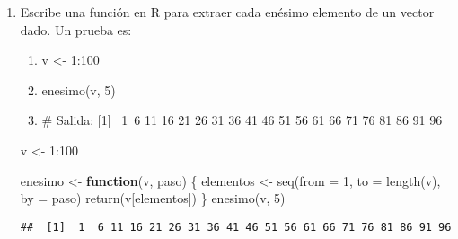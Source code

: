 \documentclass[
]{article}
\newenvironment{Shaded}{\begin{snugshade}}{\end{snugshade}}
\newcommand{\AttributeTok}[1]{\textcolor[rgb]{0.77,0.63,0.00}{#1}}
\newcommand{\ControlFlowTok}[1]{\textcolor[rgb]{0.13,0.29,0.53}{\textbf{#1}}}
\newcommand{\DecValTok}[1]{\textcolor[rgb]{0.00,0.00,0.81}{#1}}
\newcommand{\FunctionTok}[1]{\textcolor[rgb]{0.00,0.00,0.00}{#1}}
\newcommand{\NormalTok}[1]{#1}
\newcommand{\OtherTok}[1]{\textcolor[rgb]{0.56,0.35,0.01}{#1}}
\newcommand{\SpecialCharTok}[1]{\textcolor[rgb]{0.00,0.00,0.00}{#1}}
\begin{document}
\begin{enumerate}
\def\labelenumi{\arabic{enumi}.}
\setcounter{enumi}{8}
\item
  Escribe una función en R para extraer cada enésimo elemento de un
  vector dado. Un prueba es:

  \begin{enumerate}
  \def\labelenumii{\alph{enumii}.}
  \item
    v \textless- 1:100
  \item
    enesimo(v, 5)
  \item
    \# Salida: {[}1{]}~ 1~6 11 16 21 26 31 36 41 46 51 56 61 66 71 76 81
    86 91 96
  \end{enumerate}

\begin{Shaded}
\begin{Highlighting}[]
\NormalTok{v }\OtherTok{\textless{}{-}} \DecValTok{1}\SpecialCharTok{:}\DecValTok{100}

\NormalTok{enesimo }\OtherTok{\textless{}{-}} \ControlFlowTok{function}\NormalTok{(v, paso) \{}
\NormalTok{  elementos }\OtherTok{\textless{}{-}} \FunctionTok{seq}\NormalTok{(}\AttributeTok{from =} \DecValTok{1}\NormalTok{, }\AttributeTok{to =} \FunctionTok{length}\NormalTok{(v), }\AttributeTok{by =}\NormalTok{ paso)}
  \FunctionTok{return}\NormalTok{(v[elementos])}
\NormalTok{\}}
\FunctionTok{enesimo}\NormalTok{(v, }\DecValTok{5}\NormalTok{)}
\end{Highlighting}
\end{Shaded}

\begin{verbatim}
##  [1]  1  6 11 16 21 26 31 36 41 46 51 56 61 66 71 76 81 86 91 96
\end{verbatim}
\end{enumerate}
\end{document}
